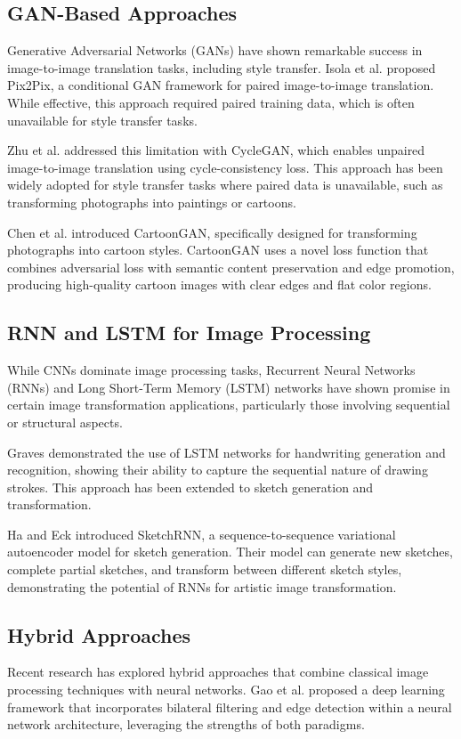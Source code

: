 \documentclass[conference]{IEEEtran}
\begin{document}
\subsection{GAN-Based Approaches}
Generative Adversarial Networks (GANs) have shown remarkable success in image-to-image translation tasks, including style transfer. Isola et al. \cite{isola2017image} proposed Pix2Pix, a conditional GAN framework for paired image-to-image translation. While effective, this approach required paired training data, which is often unavailable for style transfer tasks.

Zhu et al. \cite{zhu2017unpaired} addressed this limitation with CycleGAN, which enables unpaired image-to-image translation using cycle-consistency loss. This approach has been widely adopted for style transfer tasks where paired data is unavailable, such as transforming photographs into paintings or cartoons.

Chen et al. \cite{chen2018cartoongan} introduced CartoonGAN, specifically designed for transforming photographs into cartoon styles. CartoonGAN uses a novel loss function that combines adversarial loss with semantic content preservation and edge promotion, producing high-quality cartoon images with clear edges and flat color regions.

\subsection{RNN and LSTM for Image Processing}
While CNNs dominate image processing tasks, Recurrent Neural Networks (RNNs) and Long Short-Term Memory (LSTM) networks have shown promise in certain image transformation applications, particularly those involving sequential or structural aspects.

Graves \cite{graves2013generating} demonstrated the use of LSTM networks for handwriting generation and recognition, showing their ability to capture the sequential nature of drawing strokes. This approach has been extended to sketch generation and transformation.

Ha and Eck \cite{ha2017neural} introduced SketchRNN, a sequence-to-sequence variational autoencoder model for sketch generation. Their model can generate new sketches, complete partial sketches, and transform between different sketch styles, demonstrating the potential of RNNs for artistic image transformation.

\subsection{Hybrid Approaches}
Recent research has explored hybrid approaches that combine classical image processing techniques with neural networks. Gao et al. \cite{gao2020deep} proposed a deep learning framework that incorporates bilateral filtering and edge detection within a neural network architecture, leveraging the strengths of both paradigms.
\end{document}
